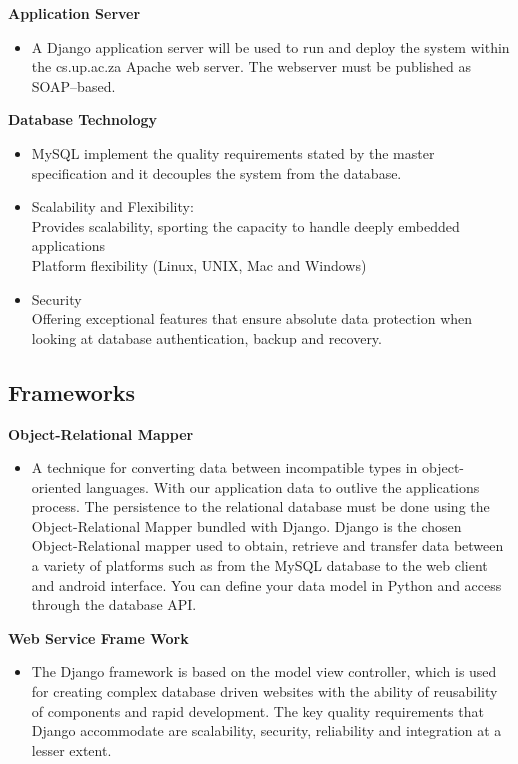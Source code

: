 \documentclass[12pt]{article}
\begin{document}
		\indent\indent\indent\linebreak\textbf{Application Server}
		\begin{itemize}
		\item A Django application server will be used to run and deploy the system within the cs.up.ac.za Apache web server. The webserver must be published as SOAP–based.
		
		\end{itemize}                                
		\indent\indent\indent\linebreak\textbf{Database Technology}
		\begin{itemize}
\item MySQL implement the quality requirements stated by the master specification and it decouples the system from the database. \\
			\item Scalability and Flexibility: \\
				Provides scalability, sporting the capacity to handle deeply embedded applications \\
				Platform flexibility (Linux, UNIX, Mac and Windows)
			\item Security \\
				Offering exceptional features that ensure absolute data protection when looking at database authentication, backup and recovery.
		\end{itemize}
		
		\vspace{0.5cm}
	
	\subsection{Frameworks}
	
		\vspace{0.5cm}
	
		\indent\indent \textbf{Object-Relational Mapper}
		\begin{itemize}
		\item A technique for converting data between incompatible types in object-oriented languages. With our application data to outlive the applications process. 
		The persistence to the relational database must be done using the Object-Relational Mapper bundled with Django. Django is the chosen Object-Relational mapper used to obtain, retrieve and transfer data between a variety of platforms such as from the MySQL database to the web client and android interface. You can define your data model in Python and access through the database API.
		\end{itemize}	
\indent\indent \textbf{Web Service Frame Work}
		\begin{itemize}
		\item The Django framework is based on the model view controller, which is used for creating complex database driven websites with the ability of reusability of components and rapid development. 
		The key quality requirements that Django accommodate are scalability, security, reliability and integration at a lesser extent.
		
		\end{itemize}	
		
\end{document}
